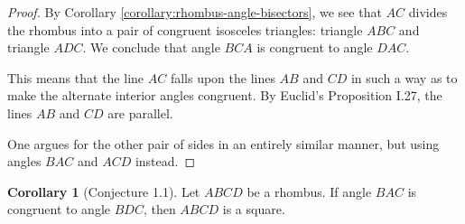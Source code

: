 \documentclass{tufte-handout}
\theoremstyle{definition}
\newtheorem{corollary}[theorem]{Corollary}
\begin{document}
\begin{proof}
By Corollary \ref{corollary:rhombus-angle-bisectors}, we see that $AC$ divides the rhombus into a pair of congruent isosceles triangles: triangle $ABC$ and triangle $ADC$. We conclude that angle $BCA$ is congruent to angle $DAC$.

This means that the line $AC$ falls upon the lines $AB$ and $CD$ in such a way as to make the alternate interior angles congruent. By Euclid's Proposition I.27, the lines $AB$ and $CD$ are parallel.

One argues for the other pair of sides in an entirely similar manner, but using angles $BAC$ and $ACD$ instead.
\end{proof}


\begin{corollary}[Conjecture 1.1]\label{corollary:rhombus-rigidity}
Let $ABCD$ be a rhombus. If angle $BAC$ is congruent to angle $BDC$, then $ABCD$ is a square.
\end{corollary}
\end{document}
